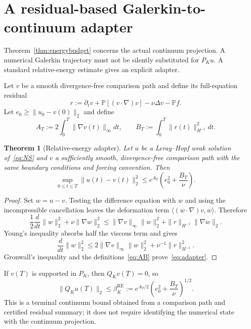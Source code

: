 \documentclass[11pt]{article}
\newtheorem{theorem}{Theorem}
\theoremstyle{definition}
\begin{document}
\section{A residual-based Galerkin-to-continuum adapter}

Theorem~\ref{thm:energybudget} concerns the actual continuum projection.  A numerical Galerkin
trajectory must not be silently substituted for $P_Ku$.  A standard relative-energy estimate gives
an explicit adapter.

Let $v$ be a smooth divergence-free comparison path and define its full-equation residual
\begin{equation}\label{eq:residual}
r
:=\partial_t v+\mathbb P[(v\cdot\nabla)v]-\nu\Delta v-\mathbb P f.
\end{equation}
Let $e_0\ge\|u_0-v(0)\|_2$ and define
\begin{equation}\label{eq:AB}
A_T:=2\int_0^T\|\nabla v(t)\|_\infty dt,
\qquad
B_T:=\int_0^T\|r(t)\|_{H^{-1}}^2dt.
\end{equation}

\begin{theorem}[Relative-energy adapter]\label{thm:adapter}
Let $u$ be a Leray--Hopf weak solution of~\eqref{eq:NS} and $v$ a sufficiently smooth,
divergence-free comparison path with the same boundary conditions and forcing convention.  Then
\begin{equation}\label{eq:adapter}
\boxed{
\sup_{0\le t\le T}\|u(t)-v(t)\|_2^2
\le
e^{A_T}\left(e_0^2+\frac{B_T}{\nu}\right).
}
\end{equation}
\end{theorem}

\begin{proof}
Set $w=u-v$.  Testing the difference equation with $w$ and using the incompressible cancellation
leaves the deformation term $\langle (w\cdot\nabla)v,w\rangle$.  Therefore
\[
\frac12\frac{d}{dt}\|w\|_2^2+\nu\|\nabla w\|_2^2
\le \|\nabla v\|_\infty\|w\|_2^2
+\|r\|_{H^{-1}}\|\nabla w\|_2.
\]
Young's inequality absorbs half the viscous term and gives
\[
\frac{d}{dt}\|w\|_2^2
\le 2\|\nabla v\|_\infty\|w\|_2^2
+\nu^{-1}\|r\|_{H^{-1}}^2.
\]
Gronwall's inequality and the definitions~\eqref{eq:AB} prove~\eqref{eq:adapter}.
\end{proof}

If $v(T)$ is supported in $P_K$, then $Q_Kv(T)=0$, so
\begin{equation}\label{eq:relativebeta}
\boxed{
\|Q_Ku(T)\|_2
\le
\beta_K^{\mathrm{RE}}
:=e^{A_T/2}
\left(e_0^2+\frac{B_T}{\nu}\right)^{1/2}.
}
\end{equation}
This is a terminal continuum bound obtained from a comparison path and certified residual summary;
it does not require identifying the numerical state with the continuum projection.
\end{document}
